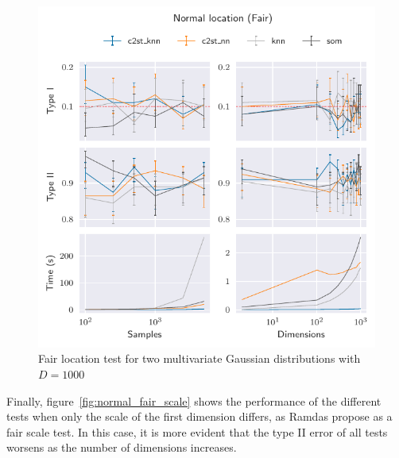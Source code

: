 \begin{figure}[htbp]
    \centering
    \includegraphics{images/6_som/normal_location_fair}
    \caption{Fair location test for two multivariate Gaussian distributions with $D=1000$}
    \label{fig:normal_fair_location}
\end{figure}

Finally, figure~\ref{fig:normal_fair_scale} shows the performance of the different
tests when only the scale of the first dimension differs, as Ramdas \etal propose
as a fair scale test. In this case, it is more evident that the type II error of all
tests worsens as the number of dimensions increases.


